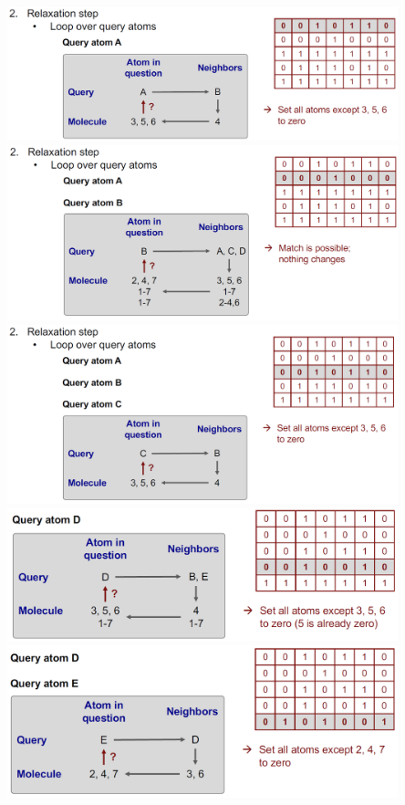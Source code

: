 \begin{enumerate}
    \begin{center}\includegraphics[width=0.85\textwidth]{img/cheminformatics/UllmannRelaxationA.png}\\\includegraphics[width=0.85\textwidth]{img/cheminformatics/UllmannRelaxationB.png}\\\includegraphics[width=0.85\textwidth]{img/cheminformatics/UllmannRelaxationC.png}\\\includegraphics[width=0.85\textwidth]{img/cheminformatics/UllmannRelaxationD.png}\\\includegraphics[width=0.85\textwidth]{img/cheminformatics/UllmannRelaxationE.png}\end{center}

\end{enumerate}
